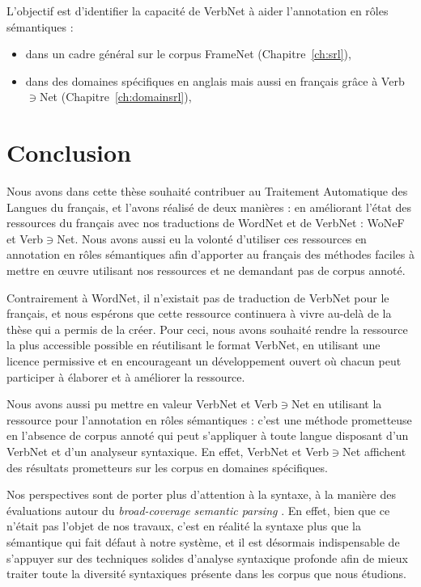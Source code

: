 \documentclass[oneside,parskip]{scrbook}
\newcommand{\verbenet}{Verb$\ni$Net}
\begin{document}
L'objectif est d'identifier la capacité de VerbNet à aider l'annotation en
rôles sémantiques :
\begin{itemize}
    \item dans un cadre général sur le corpus FrameNet (Chapitre~\ref{ch:srl}),
    \item dans des domaines spécifiques en anglais mais aussi en français grâce
        à \verbenet{} (Chapitre~\ref{ch:domainsrl}),
\end{itemize}





\chapter{Conclusion}
\label{ch:conc}

Nous avons dans cette thèse souhaité contribuer au Traitement Automatique des
Langues du français, et l'avons réalisé de deux manières : en améliorant l'état
des ressources du français avec nos traductions de WordNet et de VerbNet :
WoNeF et \verbenet{}. Nous avons aussi eu la volonté d'utiliser ces ressources
en annotation en rôles sémantiques afin d'apporter au français des méthodes
faciles à mettre en œuvre utilisant nos ressources et ne demandant pas de
corpus annoté.

Contrairement à WordNet, il n'existait pas de traduction de VerbNet pour le
français, et nous espérons que cette ressource continuera à vivre au-delà de la
thèse qui a permis de la créer. Pour ceci, nous avons souhaité rendre la
ressource la plus accessible possible en réutilisant le format VerbNet, en
utilisant une licence permissive et en encourageant un développement ouvert où
chacun peut participer à élaborer et à améliorer la ressource.

Nous avons aussi pu mettre en valeur VerbNet et \verbenet{} en utilisant la
ressource pour l'annotation en rôles sémantiques : c'est une méthode
prometteuse en l'absence de corpus annoté qui peut s'appliquer à toute langue
disposant d'un VerbNet et d'un analyseur syntaxique. En effet, VerbNet et
\verbenet{} affichent des résultats prometteurs sur les corpus en domaines
spécifiques.

Nos perspectives sont de porter plus d'attention à la syntaxe, à la manière des
évaluations autour du \textit{broad-coverage semantic parsing}
\citep{oepen2014broad}. En effet, bien que ce n'était pas l'objet de nos
travaux, c'est en réalité la syntaxe plus que la sémantique qui fait défaut à
notre système, et il est désormais indispensable de s'appuyer sur des
techniques solides d'analyse syntaxique profonde afin de mieux traiter toute la
diversité syntaxiques présente dans les corpus que nous étudions.
\end{document}
